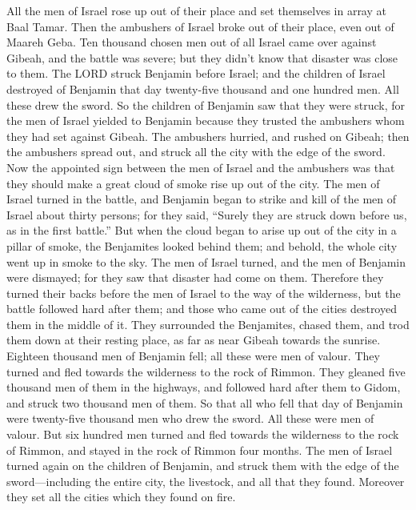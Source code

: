  All the men of Israel rose up out of their place and set
themselves in array at Baal Tamar. Then the ambushers of Israel broke
out of their place, even out of Maareh Geba.  Ten thousand
chosen men out of all Israel came over against Gibeah, and the battle
was severe; but they didn't know that disaster was close to them.
 The LORD struck Benjamin before Israel; and the children
of Israel destroyed of Benjamin that day twenty-five thousand and one
hundred men. All these drew the sword.  So the children of
Benjamin saw that they were struck, for the men of Israel yielded to
Benjamin because they trusted the ambushers whom they had set against
Gibeah.  The ambushers hurried, and rushed on Gibeah; then
the ambushers spread out, and struck all the city with the edge of the
sword.  Now the appointed sign between the men of Israel
and the ambushers was that they should make a great cloud of smoke rise
up out of the city.  The men of Israel turned in the
battle, and Benjamin began to strike and kill of the men of Israel about
thirty persons; for they said, ``Surely they are struck down before us,
as in the first battle.''  But when the cloud began to
arise up out of the city in a pillar of smoke, the Benjamites looked
behind them; and behold, the whole city went up in smoke to the sky.
 The men of Israel turned, and the men of Benjamin were
dismayed; for they saw that disaster had come on them. 
Therefore they turned their backs before the men of Israel to the way of
the wilderness, but the battle followed hard after them; and those who
came out of the cities destroyed them in the middle of it. 
They surrounded the Benjamites, chased them, and trod them down at their
resting place, as far as near Gibeah towards the sunrise. 
Eighteen thousand men of Benjamin fell; all these were men of valour.
 They turned and fled towards the wilderness to the rock of
Rimmon. They gleaned five thousand men of them in the highways, and
followed hard after them to Gidom, and struck two thousand men of them.
 So that all who fell that day of Benjamin were twenty-five
thousand men who drew the sword. All these were men of valour.
 But six hundred men turned and fled towards the wilderness
to the rock of Rimmon, and stayed in the rock of Rimmon four months.
 The men of Israel turned again on the children of
Benjamin, and struck them with the edge of the sword---including the
entire city, the livestock, and all that they found. Moreover they set
all the cities which they found on fire.

